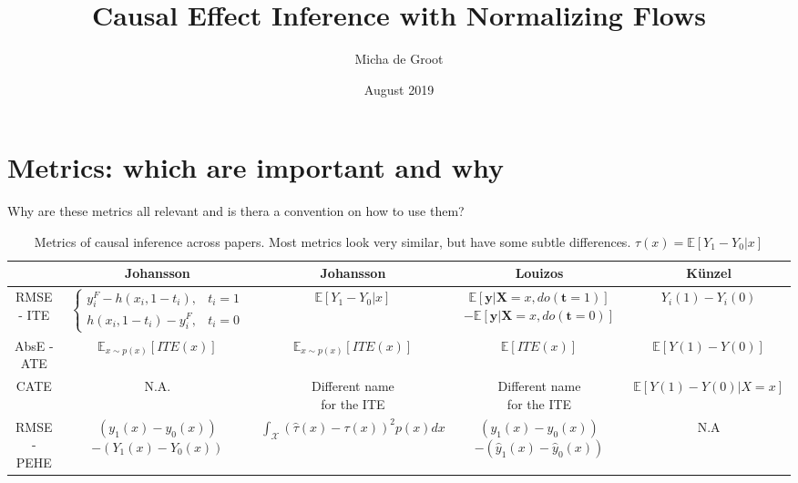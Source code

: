 \documentclass{article}
\title{Causal Effect Inference with Normalizing Flows}
\author{Micha de Groot}
\date{August 2019}
\begin{document}
\section*{Metrics: which are important and why}
   Why are these metrics all relevant and is thera a convention on how to use them?
   \vspace{5cm}
    \begin{table}[h]
        \centering
        \bgroup
        \def\arraystretch{3}%
        \begin{tabular}{c|c|c|c|c}
             &  Johansson \cite{johansson2016learning} & Johansson \cite{shalit2017estimating} & Louizos \cite{louizos2017causal} & Künzel \cite{kunzel2019metalearners}\\
             \hline
            RMSE - ITE & 
                $\begin{cases}
                y_i^F - h(x_i, 1-t_i), & t_i=1\\
                h(x_i, 1-t_i) - y_i^F, & t_i=0
                \end{cases}$ &
                $\mathbb{E}[Y_1 - Y_0 | x] $ & 
                \pbox{20cm}{$\mathbb{E}[\mathbf{y} | \mathbf{X} = x, do(\mathbf{t} = 1)]$\\ 
                $- \mathbb{E}[\mathbf{y} | \mathbf{X} = x, do(\mathbf{t} = 0)]$} & 
                $Y_i(1) - Y_i(0)$\\
            \hline
            AbsE - ATE & 
            $\mathbb{E}_{x\sim p(x)}[ITE(x)]$ & $\mathbb{E}_{x\sim p(x)}[ITE(x)]$ & $\mathbb{E}[ITE(x)]$ & $\mathbb{E}[Y(1) - Y(0)]$\\
            \hline
            CATE & N.A. & \pbox{20cm}{Different name\\ for the ITE} & \pbox{20cm}{Different name\\ for the ITE} & $\mathbb{E}[Y(1) - Y(0)|X=x] $\\
            \hline
            RMSE - PEHE & 
            \pbox{20cm}{$(y_1(x) - y_0(x))$ \\$- (Y_1(x) - Y_0(x))$} & 
            $ \int_\mathcal{X}(\hat{\tau}(x) -\tau(x))^2p(x) dx$ & 
            \pbox{20cm}{$(y_1(x) - y_0(x))$ \\$- (\hat{y}_1(x) - \hat{y}_0(x))$}& 
            N.A \\
        \end{tabular}
        \egroup
        \caption{Metrics of causal inference across papers. Most metrics look very  similar, but have some subtle differences.  $\tau(x) = \mathbb{E}[Y_1 - Y_0|x]$}
        \label{tab:metrics}
    \end{table}
\end{document}

